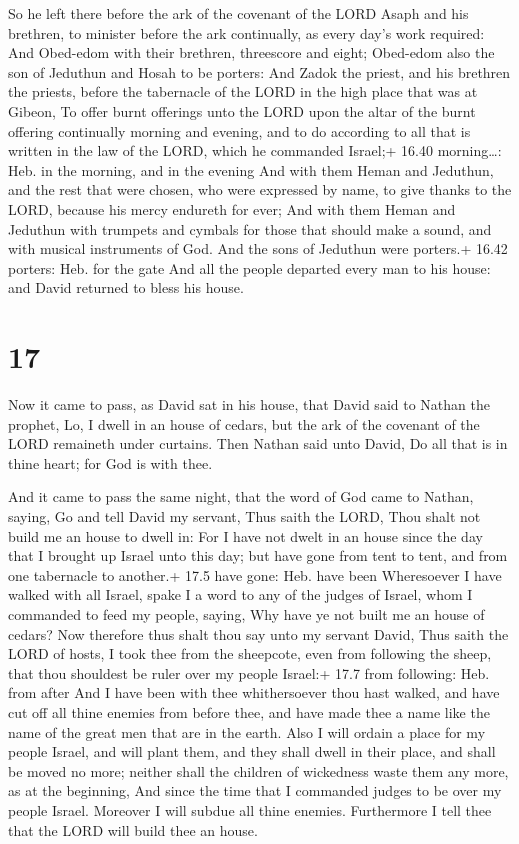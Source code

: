  So he left there before the ark of the covenant of the
LORD Asaph and his brethren, to minister before the ark continually, as
every day's work required:  And Obed-edom with their
brethren, threescore and eight; Obed-edom also the son of Jeduthun and
Hosah to be porters:  And Zadok the priest, and his
brethren the priests, before the tabernacle of the LORD in the high
place that was at Gibeon,  To offer burnt offerings unto
the LORD upon the altar of the burnt offering continually morning and
evening, and to do according to all that is written in the law of the
LORD, which he commanded Israel;+ 16.40 morning\ldots: Heb. in the
morning, and in the evening  And with them Heman and
Jeduthun, and the rest that were chosen, who were expressed by name, to
give thanks to the LORD, because his mercy endureth for ever;
 And with them Heman and Jeduthun with trumpets and cymbals
for those that should make a sound, and with musical instruments of God.
And the sons of Jeduthun were porters.+ 16.42 porters: Heb. for the gate
 And all the people departed every man to his house: and
David returned to bless his house.

\hypertarget{section-16}{%
\section{17}\label{section-16}}

 Now it came to pass, as David sat in his house, that David
said to Nathan the prophet, Lo, I dwell in an house of cedars, but the
ark of the covenant of the LORD remaineth under curtains. 
Then Nathan said unto David, Do all that is in thine heart; for God is
with thee.

 And it came to pass the same night, that the word of God
came to Nathan, saying,  Go and tell David my servant, Thus
saith the LORD, Thou shalt not build me an house to dwell in:
 For I have not dwelt in an house since the day that I
brought up Israel unto this day; but have gone from tent to tent, and
from one tabernacle to another.+ 17.5 have gone: Heb. have been
 Wheresoever I have walked with all Israel, spake I a word
to any of the judges of Israel, whom I commanded to feed my people,
saying, Why have ye not built me an house of cedars?  Now
therefore thus shalt thou say unto my servant David, Thus saith the LORD
of hosts, I took thee from the sheepcote, even from following the sheep,
that thou shouldest be ruler over my people Israel:+ 17.7 from
following: Heb. from after  And I have been with thee
whithersoever thou hast walked, and have cut off all thine enemies from
before thee, and have made thee a name like the name of the great men
that are in the earth.  Also I will ordain a place for my
people Israel, and will plant them, and they shall dwell in their place,
and shall be moved no more; neither shall the children of wickedness
waste them any more, as at the beginning,  And since the
time that I commanded judges to be over my people Israel. Moreover I
will subdue all thine enemies. Furthermore I tell thee that the LORD
will build thee an house.

